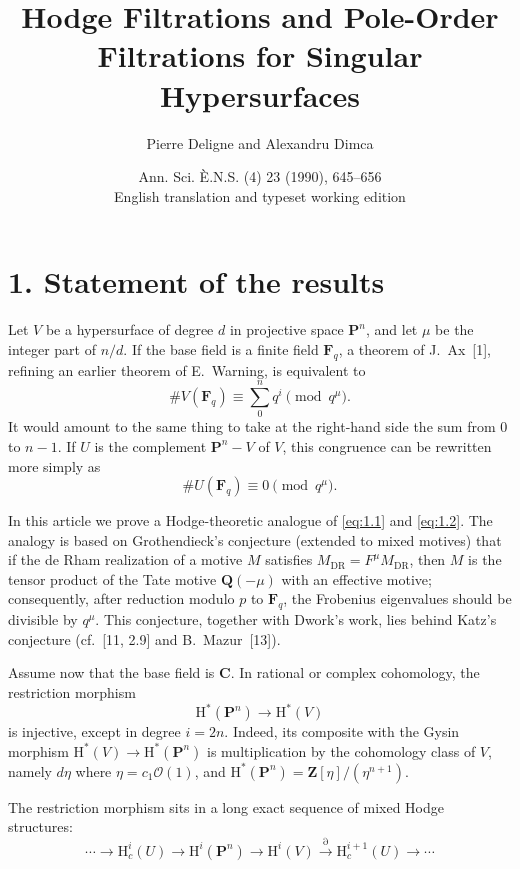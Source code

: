 \documentclass[11pt]{amsart}
\title[Hodge and pole-order filtrations]{Hodge Filtrations and Pole-Order Filtrations for Singular Hypersurfaces}
\author{Pierre Deligne and Alexandru Dimca}
\date{Ann. Sci. \`E.N.S. (4) 23 (1990), 645--656\\English translation and typeset working edition}
\theoremstyle{definition}
\begin{document}
\maketitle

\section*{1. Statement of the results}

Let $V$ be a hypersurface of degree $d$ in projective space $\mathbf P^n$, and let $\mu$ be the integer part of $n/d$. If the base field is a finite field $\mathbf F_q$, a theorem of J.~Ax~[1], refining an earlier theorem of E.~Warning, is equivalent to
\begin{equation}\label{eq:1.1}
\# V(\mathbf F_q) \equiv \sum_0^n q^i \pmod{q^\mu}.
\tag{1.1}
\end{equation}
It would amount to the same thing to take at the right-hand side the sum from $0$ to $n-1$. If $U$ is the complement $\mathbf P^n-V$ of $V$, this congruence can be rewritten more simply as
\begin{equation}\label{eq:1.2}
\# U(\mathbf F_q) \equiv 0 \pmod{q^\mu}.
\tag{1.2}
\end{equation}

In this article we prove a Hodge-theoretic analogue of \eqref{eq:1.1} and \eqref{eq:1.2}. The analogy is based on Grothendieck's conjecture (extended to mixed motives) that if the de Rham realization of a motive $M$ satisfies $M_{\mathrm{DR}} = F^\mu M_{\mathrm{DR}}$, then $M$ is the tensor product of the Tate motive $\mathbf Q(-\mu)$ with an effective motive; consequently, after reduction modulo $p$ to $\mathbf F_q$, the Frobenius eigenvalues should be divisible by $q^\mu$. This conjecture, together with Dwork's work, lies behind Katz's conjecture (cf.~[11, 2.9] and B.~Mazur~[13]).

Assume now that the base field is $\mathbf C$. In rational or complex cohomology, the restriction morphism
\[
\mathrm H^*(\mathbf P^n) \to \mathrm H^*(V)
\]
is injective, except in degree $i=2n$. Indeed, its composite with the Gysin morphism $\mathrm H^*(V)\to \mathrm H^*(\mathbf P^n)$ is multiplication by the cohomology class of $V$, namely $d\eta$ where $\eta = c_1\mathscr O(1)$, and $\mathrm H^*(\mathbf P^n)=\mathbf Z[\eta]/(\eta^{n+1})$.

The restriction morphism sits in a long exact sequence of mixed Hodge structures:
\begin{equation}\label{eq:1.3}
\cdots \to \mathrm H_c^i(U) \to \mathrm H^i(\mathbf P^n) \to \mathrm H^i(V) \xrightarrow{\partial} \mathrm H_c^{i+1}(U) \to \cdots
\tag{1.3}
\end{equation}
\end{document}
